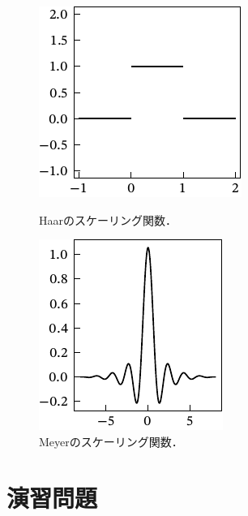 \documentclass[../../main]{subfiles}
\begin{document}
\begin{figure}[htbp]
  \begin{minipage}{0.5\linewidth}
    \centering
    \includegraphics{figures/haar_scaling}
    \caption{Haarのスケーリング関数．}
  \end{minipage}%
  \begin{minipage}{0.5\linewidth}
    \centering
    \includegraphics{figures/meyer_scaling}
    \caption{Meyerのスケーリング関数．}
  \end{minipage}
\end{figure}

\section{演習問題}
\end{document}
